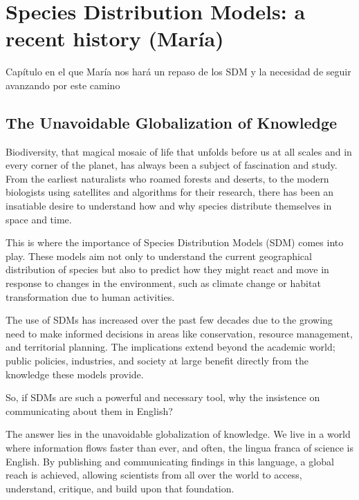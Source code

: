 \documentclass[
]{krantz}
\begin{document}
\hypertarget{species-distribution-models-a-recent-history-maruxeda}{%
\chapter{Species Distribution Models: a recent history (María)}\label{species-distribution-models-a-recent-history-maruxeda}}

Capítulo en el que María nos hará un repaso de los SDM y la necesidad de seguir avanzando por este camino

\hypertarget{the-unavoidable-globalization-of-knowledge}{%
\section{The Unavoidable Globalization of Knowledge}\label{the-unavoidable-globalization-of-knowledge}}

Biodiversity, that magical mosaic of life that unfolds before us at all scales and in every corner of the planet, has always been a subject of fascination and study. From the earliest naturalists who roamed forests and deserts, to the modern biologists using satellites and algorithms for their research, there has been an insatiable desire to understand how and why species distribute themselves in space and time.

This is where the importance of Species Distribution Models (SDM) comes into play. These models aim not only to understand the current geographical distribution of species but also to predict how they might react and move in response to changes in the environment, such as climate change or habitat transformation due to human activities.

The use of SDMs has increased over the past few decades due to the growing need to make informed decisions in areas like conservation, resource management, and territorial planning. The implications extend beyond the academic world; public policies, industries, and society at large benefit directly from the knowledge these models provide.

So, if SDMs are such a powerful and necessary tool, why the insistence on communicating about them in English?

The answer lies in the unavoidable globalization of knowledge. We live in a world where information flows faster than ever, and often, the lingua franca of science is English. By publishing and communicating findings in this language, a global reach is achieved, allowing scientists from all over the world to access, understand, critique, and build upon that foundation.
\end{document}
